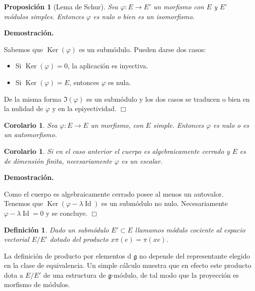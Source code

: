 \documentclass[a4paper,draft,12pt]{scrartcl}
\newtheorem{defi}{Definición}[section]%
\newtheorem{propo}[teo]{Proposición}%
\newtheorem{cor}[teo]{Corolario}%
\newcommand{\dem}{\noindent \textbf{Demostración. }\vspace{0.3 cm}}%
\newcommand{\g}{\mathfrak{g}}%
\newcommand{\fin}{ $\Box $ \vspace{0.4 cm}}
\DeclareMathOperator{\Ker}{Ker}%
\DeclareMathOperator{\Id}{Id}%
\begin{document}
\begin{propo}[Lema de Schur] 

Sea $\varphi: E \rightarrow E'$ un morfismo con $E$ y $E'$ módulos simples.  Entonces $\varphi$ es nulo o bien es un isomorfismo.

\end{propo}

\dem

Sabemos que $\Ker(\varphi)$ es un submódulo.  Pueden darse dos casos:

\begin{itemize}

\item Si $\Ker(\varphi)=0$, la aplicación es inyectiva.

\item Si $\Ker(\varphi)=E$, entonces $\varphi$ es nula.

\end{itemize}

De la misma forma $\Im(\varphi)$ es un submódulo y los dos casos se traducen o bien en la nulidad de $\varphi$ y en la epiyectividad. \fin

\begin{cor}

Sea $\varphi: E \rightarrow E$ un morfismo, con $E$ simple.  Entonces $\varphi$ es nulo o es un automorfismo.

\end{cor}

\begin{cor}

Si en el caso anterior el cuerpo es algebraicamente cerrado y $E$ es de dimensión finita, necesariamente $\varphi$ es un escalar.

\end{cor}

\dem

Como el cuerpo es algebraicamente cerrado posee al menos un autovalor.  Tenemos que $\Ker(\varphi-\lambda \Id)$ es un submódulo no nulo.  Necesariamente $\varphi- \lambda \Id=0$ y se concluye. \fin

\begin{defi}

Dado  un submódulo $E' \subset E$ llamamos {módulo cociente} al espacio vectorial $E/E'$ dotado del producto $x \pi(e)= \pi(xe)$.

\end{defi}

La definición de producto por elementos d $\g$ no depende del representante elegido en la clase de equivalencia.  Un simple cálculo muestra que en efecto este producto dota a $E/E'$ de una estructura de $\g$-módulo, de tal modo que la proyección es morfismo de módulos.
\end{document}
